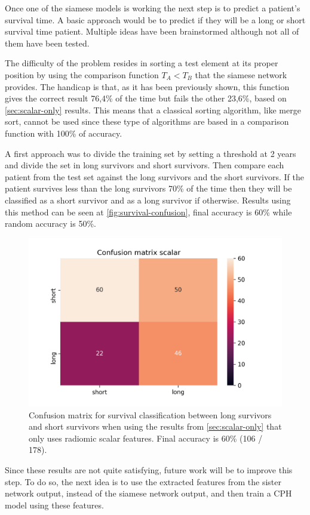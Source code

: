 Once one of the siamese models is working the next step is to predict a patient's survival
time. A basic approach would be to predict if they will be a long or short survival time 
patient. Multiple ideas have been brainstormed although not all of them have been tested.

The difficulty of the problem resides in sorting a test element at its proper position 
by using the comparison function \( T_A < T_B \) that the siamese network provides. 
The handicap is that, as it has been previously shown, this function gives the correct 
result 76,4\% of the time but fails the other 23,6\%, based on \autoref{sec:scalar-only} 
results. This means that a classical sorting algorithm, like merge sort, cannot be 
used since these type of algorithms are based in a comparison function with 100\% of accuracy.

A first approach was to divide the training set by setting a threshold at 2 years
and divide the set in long survivors and short survivors. Then compare each patient from the
test set against the long survivors and the short survivors. If the patient survives less
than the long survivors 70\% of the time then they will be classified as a short survivor and
as a long survivor if otherwise. Results using this method can be seen at 
\autoref{fig:survival-confusion}, final accuracy is 60\% while random accuracy is 50\%.

\begin{figure}
  \centering
  \includegraphics[width=.5\textwidth]{images/results/survival_scalar}

  \caption[Confusion matrix for survival classification]{
    Confusion matrix for survival classification between long survivors and short 
    survivors when using the results from \autoref{sec:scalar-only} that only uses
    radiomic scalar features. Final accuracy is 60\% (106 / 178).
    \label{fig:survival-confusion}
  }
\end{figure}

Since these results are not quite satisfying, future work will be to improve this step.
To do so, the next idea is to use the extracted features from the sister network output,
instead of the siamese network output, and then train a \gls{CPH} model using these features.

